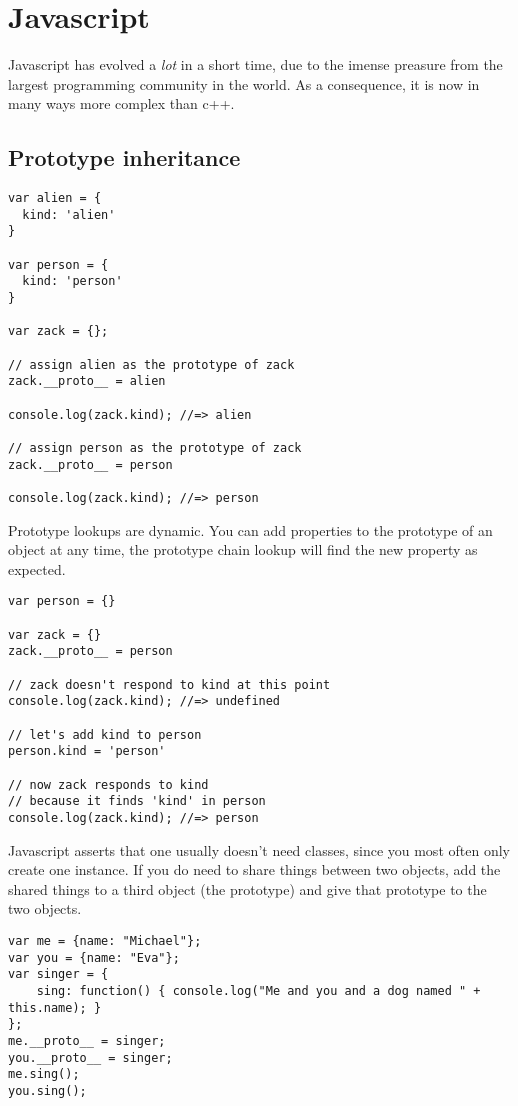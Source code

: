 \section{Javascript}

Javascript has evolved a \emph{lot} in a short time, due to the imense preasure from the largest programming community in the world. As a consequence, it is now in many ways more complex than c++.

\subsection{Prototype inheritance}

\begin{lstlisting}
var alien = {
  kind: 'alien'
}

var person = {
  kind: 'person'
}

var zack = {};

// assign alien as the prototype of zack
zack.__proto__ = alien

console.log(zack.kind); //=> alien

// assign person as the prototype of zack
zack.__proto__ = person

console.log(zack.kind); //=> person   
\end{lstlisting}

Prototype lookups are dynamic. You can add properties to the prototype of an object at any time, the prototype chain lookup will find the new property as expected.

\begin{lstlisting}
var person = {}

var zack = {}
zack.__proto__ = person

// zack doesn't respond to kind at this point
console.log(zack.kind); //=> undefined

// let's add kind to person
person.kind = 'person'

// now zack responds to kind
// because it finds 'kind' in person
console.log(zack.kind); //=> person
\end{lstlisting}

Javascript asserts that one usually doesn't need classes, since you most often only create one instance. If you do need to share things between two objects, add the shared things to a third object (the prototype) and give that prototype to the two objects. 

\begin{lstlisting}
var me = {name: "Michael"};
var you = {name: "Eva"};
var singer = { 
    sing: function() { console.log("Me and you and a dog named " + this.name); } 
};
me.__proto__ = singer;
you.__proto__ = singer;
me.sing();
you.sing();
\end{lstlisting}

